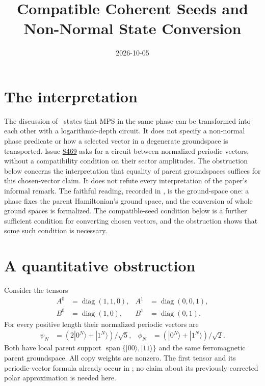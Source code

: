 \documentclass{article}
\title{Compatible Coherent Seeds and Non-Normal State Conversion}
\author{}
\date{2026-10-05}
\begin{document}
\maketitle
{}

\section{The interpretation}
The discussion of~\cite{Malz2024Preparation} states that MPS in the same
phase can be transformed into each other with a logarithmic-depth circuit.
It does not specify a non-normal phase predicate or how a selected vector
in a degenerate groundspace is transported. Issue
\href{https://github.com/LionSR/TNLean/issues/8469}{8469} asks for a circuit
between normalized periodic vectors, without a compatibility condition on
their sector amplitudes. The obstruction below concerns the interpretation
that equality of parent groundspaces suffices for this chosen-vector claim.
It does not refute every interpretation of the paper's informal remark.
The faithful reading, recorded in
\cite{gap:mswc24_same_phase_circuit_normal_case}, is the ground-space one: a
phase fixes the parent Hamiltonian's ground space, and the conversion of whole
ground spaces is formalized. The compatible-seed condition below is a further
sufficient condition for converting chosen vectors, and the obstruction shows
that some such condition is necessary.

\section{A quantitative obstruction}
Consider the tensors
\begin{align}
    A^0 & =\operatorname{diag}(1,1,0), & A^1 & =\operatorname{diag}(0,0,1), \\
    B^0 & =\operatorname{diag}(1,0),   & B^1 & =\operatorname{diag}(0,1).
\end{align}
For every positive length their normalized periodic vectors are
\begin{align}
    \psi_N & =(2|0^N\rangle+|1^N\rangle)/\sqrt5, &
    \phi_N & =(|0^N\rangle+|1^N\rangle)/\sqrt2.
\end{align}
Both have local parent support
$\operatorname{span}\{|00\rangle,|11\rangle\}$ and the same ferromagnetic
parent groundspace. All copy weights are nonzero. The first tensor and its
periodic-vector formula already occur in
; no claim about
its previously corrected polar approximation is needed here.
\end{document}
